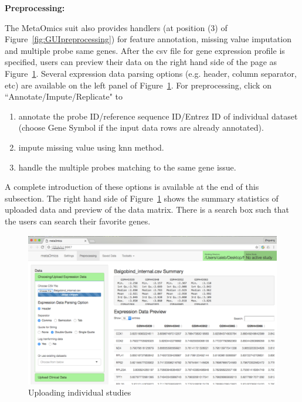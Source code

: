 \begin{steps}
\item \textbf{Preprocessing:}

The MetaOmics suit also provides handlers (at position {\color{red} (3)} of Figure~\ref{fig:GUIpreprocessing}) for feature annotation, missing value imputation and multiple probe same genes.
After the csv file for gene expression profile is specified, 
users can preview their data on the right hand side of the page as Figure~\ref{fig:GUIpreview}.
Several expression data parsing options (e.g. header, column separator, etc) are available on the left panel of Figure~\ref{fig:GUIpreview}.
For preprocessing, 
click on ``Annotate/Impute/Replicate" to 
\begin{enumerate}
\item annotate the probe ID/reference sequence ID/Entrez ID of individual dataset (choose Gene Symbol if the input data rows are already annotated).
\item impute missing value using knn method.
\item handle the multiple probes matching to the same gene issue.
\end{enumerate}

A complete introduction of these options is available at the end of this subsection.
The right hand side of Figure~\ref{fig:GUIpreview} shows the summary statistics of uploaded data and preview of the data matrix.
There is a search box such that the users can search their favorite genes.

\begin{figure}[H]
\begin{center}
\includegraphics[scale=0.7]{./figure/preprocessing/GUIpreview}
\caption{Uploading individual studies}
\label{fig:GUIpreview}
\end{center}
\end{figure}


\end{steps}
